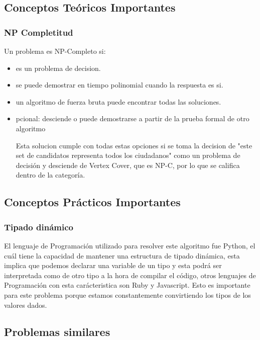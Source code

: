 \documentclass[a4paper]{article}
\begin{document}
\subsection{Conceptos Teóricos Importantes}
\subsubsection{NP Completitud}

Un problema es NP-Completo si:
\begin{itemize}
    \item es un problema de decision.
    \item se puede demostrar en tiempo polinomial cuando la respuesta es si.
    \item un algoritmo de fuerza bruta puede encontrar todas las soluciones.
    \item pcional: desciende o puede demostrarse a partir de la prueba formal de otro algoritmo
  
    Esta solucion cumple con todas estas opciones si se toma la decision de "este set de candidatos representa
    todos los ciudadanos" como un problema de decisión y desciende de Vertex Cover, que es NP-C, por lo que se 
    califica dentro de la categoría.
\end{itemize}

\subsection{Conceptos Prácticos Importantes}
\subsubsection{Tipado dinámico}
El lenguaje de Programación utilizado para resolver este algoritmo fue Python,
el cuál tiene la capacidad de mantener una estructura de tipado dinámica, esta
implica que podemos declarar una variable de un tipo y esta podrá ser interpretada
como de otro tipo a la hora de compilar el código, otros lenguajes de Programación
con esta carácteristica son Ruby y Javascript. Esto es importante para este problema
porque estamos constantemente convirtiendo los tipos de los valores dados.

\subsection{Problemas similares}
\end{document}
